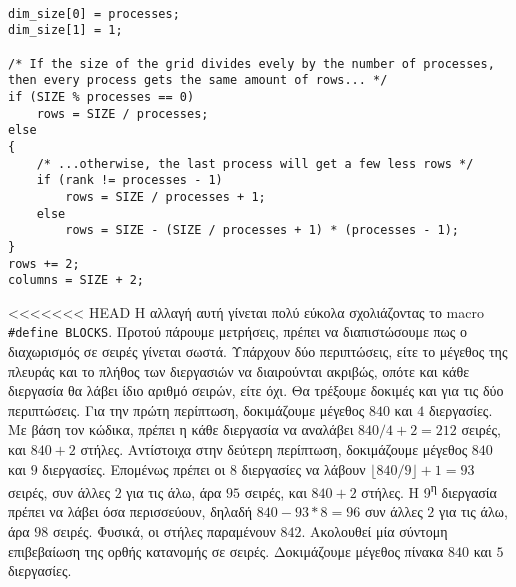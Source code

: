 \begin{tcolorbox}
\begin{verbatim}

dim_size[0] = processes;
dim_size[1] = 1;

/* If the size of the grid divides evely by the number of processes, then every process gets the same amount of rows... */
if (SIZE % processes == 0)
    rows = SIZE / processes;
else
{
    /* ...otherwise, the last process will get a few less rows */
    if (rank != processes - 1)
        rows = SIZE / processes + 1;
    else
        rows = SIZE - (SIZE / processes + 1) * (processes - 1);
}
rows += 2;
columns = SIZE + 2;
\end{verbatim}
\end{tcolorbox}

\clearpage

\begin{multicols}{2}
<<<<<<< HEAD
Η αλλαγή αυτή γίνεται πολύ εύκολα σχολιάζοντας το macro \texttt{#define BLOCKS}. Προτού πάρουμε μετρήσεις, πρέπει να διαπιστώσουμε πως ο διαχωρισμός σε σειρές γίνεται σωστά. Υπάρχουν δύο περιπτώσεις, είτε το μέγεθος της πλευράς και το πλήθος των διεργασιών να διαιρούνται ακριβώς, οπότε και κάθε διεργασία θα λάβει ίδιο αριθμό σειρών, είτε όχι. Θα τρέξουμε δοκιμές και για τις δύο περιπτώσεις. Για την πρώτη περίπτωση, δοκιμάζουμε μέγεθος $840$ και $4$ διεργασίες. Με βάση τον κώδικα, πρέπει η κάθε διεργασία να αναλάβει $840 / 4 + 2 = 212$ σειρές, και $840 + 2$ στήλες. Αντίστοιχα στην δεύτερη περίπτωση, δοκιμάζουμε μέγεθος $840$ και $9$ διεργασίες. Επομένως πρέπει οι $8$ διεργασίες να λάβουν $\lfloor 840 / 9 \rfloor + 1 = 93$ σειρές, συν άλλες $2$ για τις άλω, άρα $95$ σειρές, και $840 + 2$ στήλες. Η 9\textsuperscript{η} διεργασία πρέπει να λάβει όσα περισσεύουν, δηλαδή $840 - 93 * 8 = 96$ συν άλλες $2$ για τις άλω, άρα $98$ σειρές. Φυσικά, οι στήλες παραμένουν $842$. Ακολουθεί μία σύντομη επιβεβαίωση της ορθής κατανομής σε σειρές. Δοκιμάζουμε μέγεθος πίνακα $840$ και $5$ διεργασίες. \par
\end{multicols}

